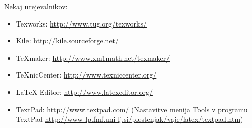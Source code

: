 Nekaj urejevalnikov:
\begin{itemize}
\item Texworks: \url{http://www.tug.org/texworks/}
\item Kile: \url {http://kile.sourceforge.net/}
\item TeXmaker: \url{http://www.xm1math.net/texmaker/}
\item TeXnicCenter: \url{http://www.texniccenter.org/}
\item LaTeX Editor: \url{http://www.latexeditor.org/}
\item TextPad: \url{http://www.textpad.com/} (Nastavitve menija Tools
  v programu TextPad \url{
    http://www-lp.fmf.uni-lj.si/plestenjak/vaje/latex/textpad.htm})
\end{itemize}

